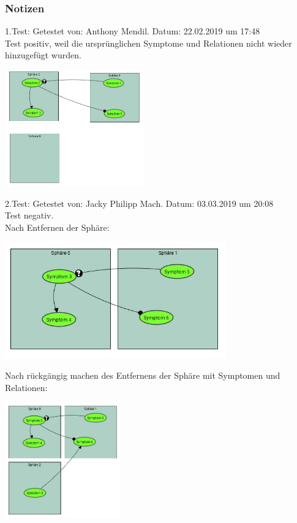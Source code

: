 \documentclass[enabledeprecatedfontcommands]{scrartcl}
\begin{document}
\subsubsection{Notizen}
1.Test: Getestet von: Anthony Mendil. Datum: 22.02.2019 um 17:48 \\
Test positiv, weil die ursprünglichen Symptome und Relationen nicht wieder hinzugefügt wurden. \\
\begin{center}
\includegraphics[height=5cm]{2_11.PNG}
\end{center}
2.Test: Getestet von: Jacky Philipp Mach. Datum: 03.03.2019 um 20:08 \\
Test negativ. \\
Nach Entfernen der Sphäre:
\begin{center}
\includegraphics[height=5cm]{2_11b.png}
\end{center}
Nach rückgängig machen des Entfernens der Sphäre mit Symptomen und Relationen:
\begin{center}
\includegraphics[height=5cm]{2_11c.png}
\end{center}
\end{document}
